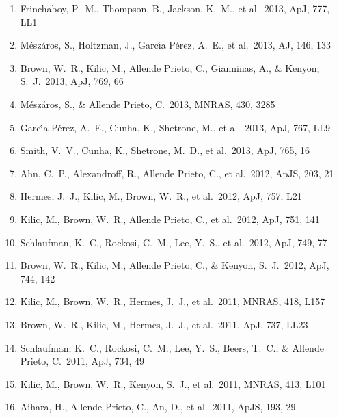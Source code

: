 \documentclass[12pt]{article}
\begin{document}
\begin{enumerate}
\item Frinchaboy, P.~M., 
Thompson, B., Jackson, K.~M., et al.\ 2013, ApJ, 777, LL1 


\item 
M{\'e}sz{\'a}ros, S., Holtzman, J., Garc{\'{\i}}a P{\'e}rez, A.~E., et al.\ 
2013, AJ, 146, 133 


\item Brown, W.~R., Kilic, M., 
Allende Prieto, C., Gianninas, A., \& Kenyon, S.~J.\ 2013, ApJ, 769, 66 


\item M{\'e}sz{\'a}ros, S., \& Allende Prieto, C.\ 2013, MNRAS, 430, 3285 


\item
Garc{\'{\i}}a P{\'e}rez, A.~E., Cunha, K., Shetrone, M., et al.\ 2013, 
ApJ, 767, LL9 


\item Smith, V.~V., Cunha, K., 
Shetrone, M.~D., et al.\ 2013, ApJ, 765, 16 


\item Ahn, C.~P., Alexandroff, 
R., Allende Prieto, C., et al.\ 2012, ApJS, 203, 21 


\item Hermes, J.~J., Kilic, 
M., Brown, W.~R., et al.\ 2012, ApJ, 757, L21 


\item Kilic, M., Brown, W.~R., 
Allende Prieto, C., et al.\ 2012, ApJ, 751, 141 


\item Schlaufman, K.~C., 
Rockosi, C.~M., Lee, Y.~S., et al.\ 2012, ApJ, 749, 77 


\item Brown, W.~R., Kilic, M., 
Allende Prieto, C., \& Kenyon, S.~J.\ 2012, ApJ, 744, 142 


\item Kilic, M., Brown, W.~R., 
Hermes, J.~J., et al.\ 2011, MNRAS, 418, L157 


\item Brown, W.~R., Kilic, M., 
Hermes, J.~J., et al.\ 2011, ApJ, 737, LL23 


\item Schlaufman, K.~C., 
Rockosi, C.~M., Lee, Y.~S., Beers, T.~C., 
\& Allende Prieto, C.\ 2011, ApJ, 734, 49 


\item Kilic, M., Brown, W.~R., 
Kenyon, S.~J., et al.\ 2011, MNRAS, 413, L101 


\item Aihara, H., Allende 
Prieto, C., An, D., et al.\ 2011, ApJS, 193, 29 



\end{enumerate}
\end{document}
